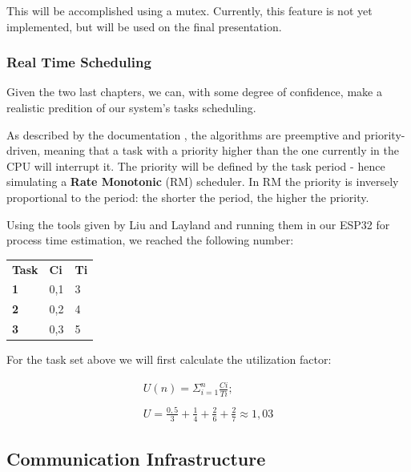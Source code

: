 \documentclass[11pt]{article}
\begin{document}
This will be accomplished using a mutex. Currently, this feature is not yet implemented, but will be used on the final presentation.

\subsubsection{Real Time Scheduling}

Given the two last chapters, we can, with some degree of confidence, make a realistic predition of our system's tasks scheduling. 

As described by the documentation \cite{c1}, the algorithms are preemptive and priority- driven, meaning that a task with a priority higher than the one currently in the CPU will interrupt it. The priority will be defined by the task period - hence simulating a \textbf{Rate Monotonic} (RM) scheduler. In RM the priority is inversely proportional to the period: the shorter the period, the higher the priority. 

Using the tools given by Liu and Layland \cite{liulayland} and running them in our ESP32 for process time estimation, we reached the following number:

\begin{table}[H]
\begin{tabular}{lll}
\textbf{Task} & \textbf{Ci} & \textbf{Ti} \\
\textbf{1}    & 0,1         & 3           \\
\textbf{2}    & 0,2         & 4           \\
\textbf{3}    & 0,3         & 5          
\end{tabular}
\end{table}

For the task set above we will first calculate the utilization factor:

\begin{equation} 
\begin{split}
	U(n) = \Sigma_{i=1}^n \frac{Ci}{Ti} ; \\
	\\
	U = \frac{0,5}{3} + \frac{1}{4} + \frac{2}{6} + \frac{2}{7} \approx 1,03
\end{split}
\end{equation}

\newpage
\subsection{Communication Infrastructure}
\end{document}
